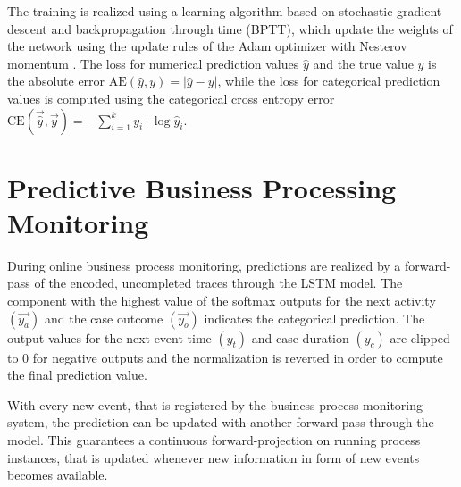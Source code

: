 The training is realized using a learning algorithm based on stochastic gradient descent and backpropagation through time (BPTT), which update the weights of the network using the update rules of the Adam optimizer with Nesterov momentum \cite{dozat2016incorporating}.
The loss for numerical prediction values $\hat{y}$ and the true value $y$ is the absolute error $\text{AE}(\hat{y},y)=|\hat{y} - y|$, while the loss for categorical prediction values is computed using the categorical cross entropy error $\text{CE}(\vec{\hat{y}}, \vec{y}) = - \sum_{i=1}^{k} y_i \cdot \log \hat{y}_i$.

\section{Predictive Business Processing Monitoring}

During online business process monitoring, predictions are realized by a forward-pass of the encoded, uncompleted traces through the LSTM model.
The component with the highest value of the softmax outputs for the next activity $(\vec{y_a})$ and the case outcome $(\vec{y_o})$ indicates the categorical prediction.
The output values for the next event time $(y_t)$ and case duration  $(y_c)$ are clipped to 0 for negative outputs and the normalization is reverted in order to compute the final prediction value.

With every new event, that is registered by the business process monitoring system, the prediction can be updated with another forward-pass through the model.
This guarantees a continuous forward-projection on running process instances, that is updated whenever new information in form of new events becomes available.